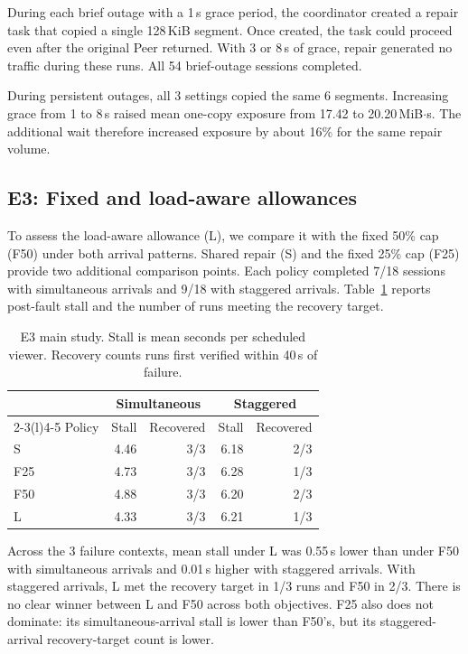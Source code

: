 During each brief outage with a 1\,s grace period, the coordinator
created a repair task that copied a single 128\,KiB segment.
Once created, the task could proceed even after the original Peer returned.
With 3 or 8\,s of grace, repair generated no traffic during these runs.
All 54 brief-outage sessions completed.

During persistent outages, all 3 settings copied the same 6 segments.
Increasing grace from 1 to 8\,s raised mean one-copy exposure from 17.42
to 20.20\,MiB$\cdot$s. The additional wait therefore increased exposure
by about 16\% for the same repair volume.

\subsection{E3: Fixed and load-aware allowances}
To assess the load-aware allowance (L), we compare it with the fixed
50\% cap (F50) under both arrival patterns. Shared repair (S) and the
fixed 25\% cap (F25) provide two additional comparison points.
Each policy completed 7/18 sessions with simultaneous arrivals and 9/18
with staggered arrivals. Table~\ref{tab:e3} reports post-fault stall and
the number of runs meeting the recovery target.

\begin{table}[ht]
\centering\small
\caption{E3 main study. Stall is mean seconds per scheduled viewer.
Recovery counts runs first verified within 40\,s of failure.}
\label{tab:e3}
\begin{tabular}{@{}l rr rr@{}}
\toprule
 & \multicolumn{2}{c}{Simultaneous} & \multicolumn{2}{c}{Staggered} \\
\cmidrule(lr){2-3}\cmidrule(l){4-5}
Policy & Stall & Recovered & Stall & Recovered \\
\midrule
S   & 4.46 & 3/3 & 6.18 & 2/3 \\
F25 & 4.73 & 3/3 & 6.28 & 1/3 \\
F50 & 4.88 & 3/3 & 6.20 & 2/3 \\
L   & 4.33 & 3/3 & 6.21 & 1/3 \\
\bottomrule
\end{tabular}
\end{table}

Across the 3 failure contexts, mean stall under L was 0.55\,s lower
than under F50 with simultaneous arrivals and 0.01\,s higher with
staggered arrivals. With staggered arrivals, L met the recovery target
in 1/3 runs and F50 in 2/3. 
There is no clear winner between L and F50 across both objectives.
F25 also does not dominate: its simultaneous-arrival stall is lower than
F50's, but its staggered-arrival recovery-target count is lower.

